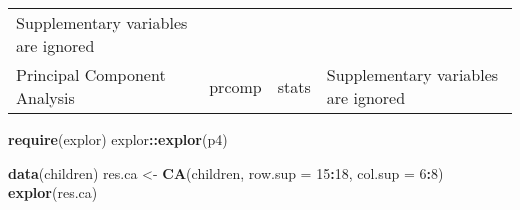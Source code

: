 \documentclass[]{article}
\newenvironment{Shaded}{\begin{snugshade}}{\end{snugshade}}
\newcommand{\KeywordTok}[1]{\textcolor[rgb]{0.13,0.29,0.53}{\textbf{#1}}}
\newcommand{\DataTypeTok}[1]{\textcolor[rgb]{0.13,0.29,0.53}{#1}}
\newcommand{\DecValTok}[1]{\textcolor[rgb]{0.00,0.00,0.81}{#1}}
\newcommand{\StringTok}[1]{\textcolor[rgb]{0.31,0.60,0.02}{#1}}
\newcommand{\ControlFlowTok}[1]{\textcolor[rgb]{0.13,0.29,0.53}{\textbf{#1}}}
\newcommand{\OperatorTok}[1]{\textcolor[rgb]{0.81,0.36,0.00}{\textbf{#1}}}
\newcommand{\NormalTok}[1]{#1}
\begin{document}
\begin{longtable}[]{@{}llll@{}}
\begin{minipage}[t]{0.11\columnwidth}
Supplementary variables are ignored\strut
\end{minipage}\tabularnewline
\begin{minipage}[t]{0.17\columnwidth}\raggedright
Principal Component Analysis\strut
\end{minipage} & \begin{minipage}[t]{0.17\columnwidth}\raggedright
prcomp\strut
\end{minipage} & \begin{minipage}[t]{0.14\columnwidth}\raggedright
stats\strut
\end{minipage} & \begin{minipage}[t]{0.11\columnwidth}\raggedright
Supplementary variables are ignored\strut
\end{minipage}\tabularnewline
\bottomrule
\end{longtable}

\begin{Shaded}
\end{Shaded}

\begin{Shaded}
\begin{Highlighting}[]
\KeywordTok{require}\NormalTok{(explor)}
\NormalTok{explor}\OperatorTok{::}\KeywordTok{explor}\NormalTok{(p4)}
\end{Highlighting}
\end{Shaded}

\begin{Shaded}
\begin{Highlighting}[]
\KeywordTok{data}\NormalTok{(children)}
\NormalTok{res.ca <-}\StringTok{ }\KeywordTok{CA}\NormalTok{(children, }\DataTypeTok{row.sup =} \DecValTok{15}\OperatorTok{:}\DecValTok{18}\NormalTok{, }\DataTypeTok{col.sup =} \DecValTok{6}\OperatorTok{:}\DecValTok{8}\NormalTok{)}
\KeywordTok{explor}\NormalTok{(res.ca)}
\end{Highlighting}
\end{Shaded}
\end{document}
